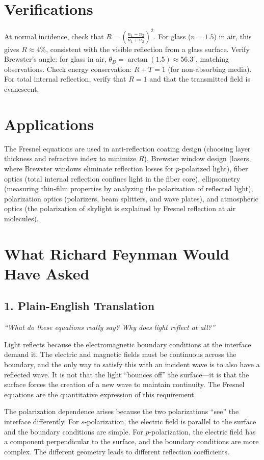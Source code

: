 \section*{Verifications}

At normal incidence, check that $R = \left(\frac{n_1 - n_2}{n_1 + n_2}\right)^2$. For glass ($n = 1.5$) in air, this gives $R \approx 4\%$, consistent with the visible reflection from a glass surface. Verify Brewster's angle: for glass in air, $\theta_B = \arctan(1.5) \approx 56.3^\circ$, matching observations. Check energy conservation: $R + T = 1$ (for non-absorbing media). For total internal reflection, verify that $R = 1$ and that the transmitted field is evanescent.
\section*{Applications}

The Fresnel equations are used in anti-reflection coating design (choosing layer thickness and refractive index to minimize $R$), Brewster window design (lasers, where Brewster windows eliminate reflection losses for $p$-polarized light), fiber optics (total internal reflection confines light in the fiber core), ellipsometry (measuring thin-film properties by analyzing the polarization of reflected light), polarization optics (polarizers, beam splitters, and wave plates), and atmospheric optics (the polarization of skylight is explained by Fresnel reflection at air molecules).
\section*{What Richard Feynman Would Have Asked}

\subsection*{1. Plain-English Translation}
\textit{``What do these equations really say? Why does light reflect at all?''}

Light reflects because the electromagnetic boundary conditions at the interface demand it. The electric and magnetic fields must be continuous across the boundary, and the only way to satisfy this with an incident wave is to also have a reflected wave. It is not that the light ``bounces off'' the surface---it is that the surface forces the creation of a new wave to maintain continuity. The Fresnel equations are the quantitative expression of this requirement.

The polarization dependence arises because the two polarizations ``see'' the interface differently. For $s$-polarization, the electric field is parallel to the surface and the boundary conditions are simple. For $p$-polarization, the electric field has a component perpendicular to the surface, and the boundary conditions are more complex. The different geometry leads to different reflection coefficients.

